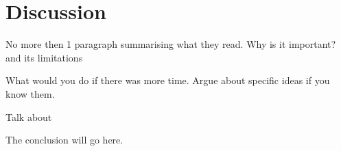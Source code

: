 
\chapter{Discussion}

No more then 1 paragraph summarising what they read.
Why is it important? and its limitations

What would you do if there was more time.
Argue about specific ideas if you know them.

Talk about 


The conclusion will go here.